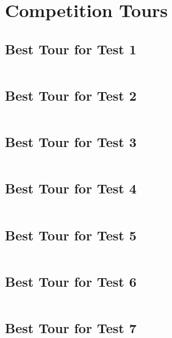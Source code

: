 \documentclass[11pt]{scrreprt}
\begin{document}
\chapter{Competition Tours}
\section{Best Tour for Test 1}

\begin{lstlisting}[basicstyle=\small,language=c]

\end{lstlisting}


\section{Best Tour for Test 2}

\begin{lstlisting}[basicstyle=\small,language=c]

\end{lstlisting}


\section{Best Tour for Test 3}

\begin{lstlisting}[basicstyle=\small,language=c]

\end{lstlisting}


\section{Best Tour for Test 4}

\begin{lstlisting}[basicstyle=\small,language=c]

\end{lstlisting}


\section{Best Tour for Test 5}

\begin{lstlisting}[basicstyle=\small,language=c]

\end{lstlisting}


\section{Best Tour for Test 6}

\begin{lstlisting}[basicstyle=\small,language=c]

\end{lstlisting}


\section{Best Tour for Test 7}

\begin{lstlisting}[basicstyle=\small,language=c]

\end{lstlisting}
\end{document}
